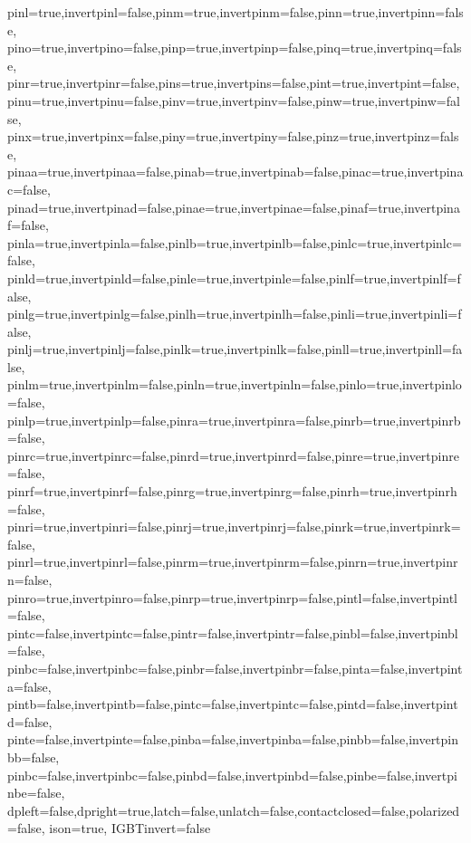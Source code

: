 {  pinl=true,invertpinl=false,pinm=true,invertpinm=false,pinn=true,invertpinn=false,
  pino=true,invertpino=false,pinp=true,invertpinp=false,pinq=true,invertpinq=false,
  pinr=true,invertpinr=false,pins=true,invertpins=false,pint=true,invertpint=false,
  pinu=true,invertpinu=false,pinv=true,invertpinv=false,pinw=true,invertpinw=false,
  pinx=true,invertpinx=false,piny=true,invertpiny=false,pinz=true,invertpinz=false,
  pinaa=true,invertpinaa=false,pinab=true,invertpinab=false,pinac=true,invertpinac=false,
  pinad=true,invertpinad=false,pinae=true,invertpinae=false,pinaf=true,invertpinaf=false,
  pinla=true,invertpinla=false,pinlb=true,invertpinlb=false,pinlc=true,invertpinlc=false,
  pinld=true,invertpinld=false,pinle=true,invertpinle=false,pinlf=true,invertpinlf=false,
  pinlg=true,invertpinlg=false,pinlh=true,invertpinlh=false,pinli=true,invertpinli=false,
  pinlj=true,invertpinlj=false,pinlk=true,invertpinlk=false,pinll=true,invertpinll=false,
  pinlm=true,invertpinlm=false,pinln=true,invertpinln=false,pinlo=true,invertpinlo=false,
  pinlp=true,invertpinlp=false,pinra=true,invertpinra=false,pinrb=true,invertpinrb=false,
  pinrc=true,invertpinrc=false,pinrd=true,invertpinrd=false,pinre=true,invertpinre=false,
  pinrf=true,invertpinrf=false,pinrg=true,invertpinrg=false,pinrh=true,invertpinrh=false,
  pinri=true,invertpinri=false,pinrj=true,invertpinrj=false,pinrk=true,invertpinrk=false,
  pinrl=true,invertpinrl=false,pinrm=true,invertpinrm=false,pinrn=true,invertpinrn=false,
  pinro=true,invertpinro=false,pinrp=true,invertpinrp=false,pintl=false,invertpintl=false,
  pintc=false,invertpintc=false,pintr=false,invertpintr=false,pinbl=false,invertpinbl=false,
  pinbc=false,invertpinbc=false,pinbr=false,invertpinbr=false,pinta=false,invertpinta=false,
  pintb=false,invertpintb=false,pintc=false,invertpintc=false,pintd=false,invertpintd=false,
  pinte=false,invertpinte=false,pinba=false,invertpinba=false,pinbb=false,invertpinbb=false,
  pinbc=false,invertpinbc=false,pinbd=false,invertpinbd=false,pinbe=false,invertpinbe=false,
  dpleft=false,dpright=true,latch=false,unlatch=false,contactclosed=false,polarized=false,
  ison=true, IGBTinvert=false	%
}%

